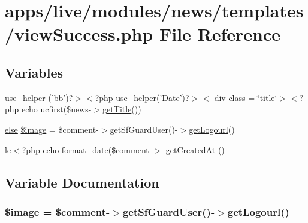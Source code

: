 \hypertarget{live_2modules_2news_2templates_2view_success_8php}{\section{apps/live/modules/news/templates/view\-Success.php File Reference}
\label{live_2modules_2news_2templates_2view_success_8php}
}
\subsection*{Variables}
\begin{DoxyCompactItemize}
\item 
\hyperlink{live_2modules_2news_2templates_2view_success_8php_a74dbb0c2c09a42cc7f5aa67bd29c2520}{use\-\_\-helper} ('bb')?$>$$<$?php use\-\_\-helper('Date')?$>$$<$ div \hyperlink{live_2modules_2news_2templates_2__actualitelight_8php_a185c73c6507391d1eb38c776b68ce96d}{class} = \char`\"{}title\char`\"{}$>$$<$?php echo ucfirst(\$news-\/$>$\hyperlink{backend_2modules_2block_2templates_2index_success_8php_a58abfb4a1e6c312e255e475413e1d76d}{get\-Title}())
\item 
\hyperlink{live_2modules_2team_2templates_2management_success_8php_a0544c3fe466e421738dae463968b70ba}{else} \hyperlink{live_2modules_2news_2templates_2view_success_8php_ad6ae3032a6e108277018579e7b89376d}{\$image} = \$comment-\/$>$get\-Sf\-Guard\-User()-\/$>$\hyperlink{backend_2modules_2tournament_2templates_2index_success_8php_a35941bec2f3cf7beef9b8010a1342325}{get\-Logourl}()
\item 
le$<$?php echo format\-\_\-date(\$comment-\/$>$ \hyperlink{live_2modules_2news_2templates_2view_success_8php_a684dd27287fcedcbe91ff8c7cc23f3bb}{get\-Created\-At} ()
\end{DoxyCompactItemize}


\subsection{Variable Documentation}
\hypertarget{live_2modules_2news_2templates_2view_success_8php_ad6ae3032a6e108277018579e7b89376d}{
\subsubsection[{\$image}]{ \$image = \$comment-\/$>$get\-Sf\-Guard\-User()-\/$>${\bf get\-Logourl}()}}\label{live_2modules_2news_2templates_2view_success_8php_ad6ae3032a6e108277018579e7b89376d}


